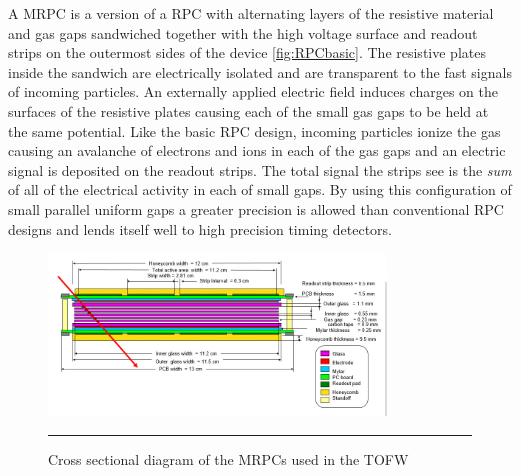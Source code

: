 A MRPC is a version of a RPC with alternating layers of the resistive material and gas gaps sandwiched together with the high voltage surface and readout strips on the outermost sides of the device \citep{Akindinov:2000rq}\ref{fig:RPCbasic}. The resistive plates inside the sandwich are electrically isolated and are transparent to the fast signals of incoming particles. An externally applied electric field induces charges on the surfaces of the resistive plates causing each of the small gas gaps to be held at the same potential. Like the basic RPC design, incoming particles ionize the gas causing an avalanche of electrons and ions in each of the gas gaps and an electric signal is deposited on the readout strips. The total signal the strips see is the \textit{sum} of all of the electrical activity in each of small gaps. By using this configuration of small parallel uniform gaps a greater precision is allowed than conventional RPC designs and lends itself well to high precision timing detectors.

\begin{figure}[ht!]
  \centering
    \includegraphics[width=0.8\textwidth]{Figures/MRPC_TOFW.jpg}
    \rule{35em}{0.5pt}
  \caption[Cross sectional diagram of the MRPCs used in the TOFW]{Cross sectional diagram of the MRPCs used in the TOFW}
  \label{fig:MRPCTOFW}
\end{figure}

